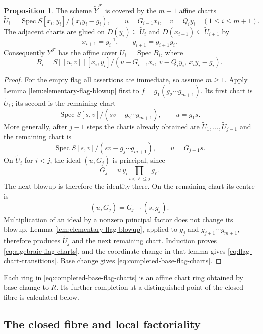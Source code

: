 \documentclass[a4paper,reqno]{amsart}
\def\F{\mathcal{F}}
\DeclareMathOperator{\Spec}{Spec}
\theoremstyle{definition}
\newtheorem{Prop}[Thm]{Proposition}
\begin{document}
\begin{Prop}\label{prop:flag-charts}
The scheme $\widetilde Y^\F$ is covered by the $m+1$ affine charts
\begin{equation}\label{eq:algebraic-flag-charts}
\widetilde U_i=\Spec S[x_i,y_i]/(x_iy_i-g_i),\qquad
u=G_{i-1}x_i,\quad v=Q_iy_i
\quad(1\le i\le m+1).
\end{equation}
The adjacent charts are glued on $D(y_i)\subseteq\widetilde U_i$ and $D(x_{i+1})\subseteq\widetilde U_{i+1}$ by
\begin{equation}\label{eq:flag-chart-transitions}
x_{i+1}=y_i^{-1},\qquad y_{i+1}=g_{i+1}y_i.
\end{equation}
Consequently $Y^\F$ has the affine cover $U_i=\Spec B_i$, where
\begin{equation}\label{eq:completed-base-flag-charts}
B_i=S[[u,v]][x_i,y_i]/(u-G_{i-1}x_i,\ v-Q_iy_i,\ x_iy_i-g_i).
\end{equation}
\end{Prop}
\begin{proof}
For the empty flag all assertions are immediate, so assume $m\ge1$.
Apply Lemma \ref{lem:elementary-flag-blowup} first to $f=g_1(g_2\cdots g_{m+1})$. Its first chart is $\widetilde U_1$; its second is the remaining chart
\[
\Spec S[s,v]/(sv-g_2\cdots g_{m+1}),\qquad u=g_1s.
\]
More generally, after $j-1$ steps the charts already obtained are $\widetilde U_1,\ldots,\widetilde U_{j-1}$ and the remaining chart is
\[
\Spec S[s,v]/(sv-g_j\cdots g_{m+1}),\qquad u=G_{j-1}s.
\]
On $\widetilde U_i$ for $i<j$, the ideal $(u,G_j)$ is principal, since
\[
G_j=u\,y_i\prod_{i<\ell\le j}g_\ell.
\]
The next blowup is therefore the identity there. On the remaining chart its centre is
\[
(u,G_j)=G_{j-1}(s,g_j).
\]
Multiplication of an ideal by a nonzero principal factor does not change its blowup. Lemma \ref{lem:elementary-flag-blowup}, applied to $g_j$ and $g_{j+1}\cdots g_{m+1}$, therefore produces $\widetilde U_j$ and the next remaining chart. Induction proves \eqref{eq:algebraic-flag-charts}, and the coordinate change in that lemma gives \eqref{eq:flag-chart-transitions}. Base change gives \eqref{eq:completed-base-flag-charts}.
\end{proof}

Each ring in \eqref{eq:completed-base-flag-charts} is an affine chart ring obtained by base change to $R$. Its further completion at a distinguished point of the closed fibre is calculated below.

\subsection{The closed fibre and local factoriality}
\end{document}
